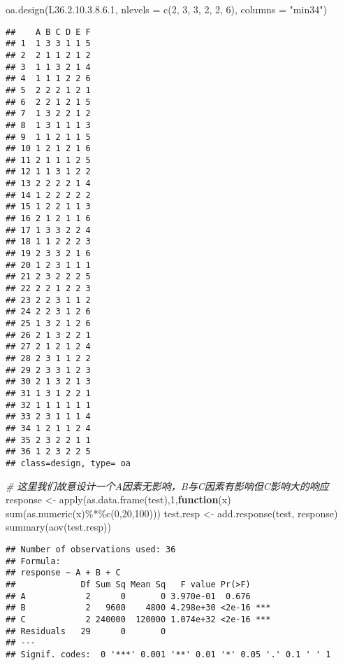 \documentclass[]{tufte-book}
\newenvironment{Shaded}{}{}
\newcommand{\AttributeTok}[1]{\textcolor[rgb]{0.49,0.56,0.16}{#1}}
\newcommand{\CommentTok}[1]{\textcolor[rgb]{0.38,0.63,0.69}{\textit{#1}}}
\newcommand{\ControlFlowTok}[1]{\textcolor[rgb]{0.00,0.44,0.13}{\textbf{#1}}}
\newcommand{\DecValTok}[1]{\textcolor[rgb]{0.25,0.63,0.44}{#1}}
\newcommand{\FloatTok}[1]{\textcolor[rgb]{0.25,0.63,0.44}{#1}}
\newcommand{\FunctionTok}[1]{\textcolor[rgb]{0.02,0.16,0.49}{#1}}
\newcommand{\NormalTok}[1]{#1}
\newcommand{\OtherTok}[1]{\textcolor[rgb]{0.00,0.44,0.13}{#1}}
\newcommand{\SpecialCharTok}[1]{\textcolor[rgb]{0.25,0.44,0.63}{#1}}
\newcommand{\StringTok}[1]{\textcolor[rgb]{0.25,0.44,0.63}{#1}}
\begin{document}
\begin{Shaded}
\begin{Highlighting}[]
\FunctionTok{oa.design}\NormalTok{(L36.}\DecValTok{2}\NormalTok{.}\DecValTok{10}\NormalTok{.}\DecValTok{3}\NormalTok{.}\DecValTok{8}\NormalTok{.}\FloatTok{6.1}\NormalTok{, }\AttributeTok{nlevels =} \FunctionTok{c}\NormalTok{(}\DecValTok{2}\NormalTok{, }\DecValTok{3}\NormalTok{, }\DecValTok{3}\NormalTok{, }\DecValTok{2}\NormalTok{, }\DecValTok{2}\NormalTok{, }\DecValTok{6}\NormalTok{), }\AttributeTok{columns =} \StringTok{"min34"}\NormalTok{)}
\end{Highlighting}
\end{Shaded}

\begin{verbatim}
##    A B C D E F
## 1  1 3 3 1 1 5
## 2  2 1 1 2 1 2
## 3  1 1 3 2 1 4
## 4  1 1 1 2 2 6
## 5  2 2 2 1 2 1
## 6  2 2 1 2 1 5
## 7  1 3 2 2 1 2
## 8  1 3 1 1 1 3
## 9  1 1 2 1 1 5
## 10 1 2 1 2 1 6
## 11 2 1 1 1 2 5
## 12 1 1 3 1 2 2
## 13 2 2 2 2 1 4
## 14 1 2 2 2 2 2
## 15 1 2 2 1 1 3
## 16 2 1 2 1 1 6
## 17 1 3 3 2 2 4
## 18 1 1 2 2 2 3
## 19 2 3 3 2 1 6
## 20 1 2 3 1 1 1
## 21 2 3 2 2 2 5
## 22 2 2 1 2 2 3
## 23 2 2 3 1 1 2
## 24 2 2 3 1 2 6
## 25 1 3 2 1 2 6
## 26 2 1 3 2 2 1
## 27 2 1 2 1 2 4
## 28 2 3 1 1 2 2
## 29 2 3 3 1 2 3
## 30 2 1 3 2 1 3
## 31 1 3 1 2 2 1
## 32 1 1 1 1 1 1
## 33 2 3 1 1 1 4
## 34 1 2 1 1 2 4
## 35 2 3 2 2 1 1
## 36 1 2 3 2 2 5
## class=design, type= oa
\end{verbatim}

\begin{Shaded}
\begin{Highlighting}[]
\CommentTok{\# 这里我们故意设计一个A因素无影响，B与C因素有影响但C影响大的响应}
\NormalTok{response }\OtherTok{\textless{}{-}} \FunctionTok{apply}\NormalTok{(}\FunctionTok{as.data.frame}\NormalTok{(test),}\DecValTok{1}\NormalTok{,}\ControlFlowTok{function}\NormalTok{(x) }\FunctionTok{sum}\NormalTok{(}\FunctionTok{as.numeric}\NormalTok{(x)}\SpecialCharTok{\%*\%}\FunctionTok{c}\NormalTok{(}\DecValTok{0}\NormalTok{,}\DecValTok{20}\NormalTok{,}\DecValTok{100}\NormalTok{)))}
\NormalTok{test.resp }\OtherTok{\textless{}{-}} \FunctionTok{add.response}\NormalTok{(test, response)}
\FunctionTok{summary}\NormalTok{(}\FunctionTok{aov}\NormalTok{(test.resp))}
\end{Highlighting}
\end{Shaded}

\begin{verbatim}
## Number of observations used: 36 
## Formula:
## response ~ A + B + C
##             Df Sum Sq Mean Sq   F value Pr(>F)    
## A            2      0       0 3.970e-01  0.676    
## B            2   9600    4800 4.298e+30 <2e-16 ***
## C            2 240000  120000 1.074e+32 <2e-16 ***
## Residuals   29      0       0                     
## ---
## Signif. codes:  0 '***' 0.001 '**' 0.01 '*' 0.05 '.' 0.1 ' ' 1
\end{verbatim}
\end{document}
